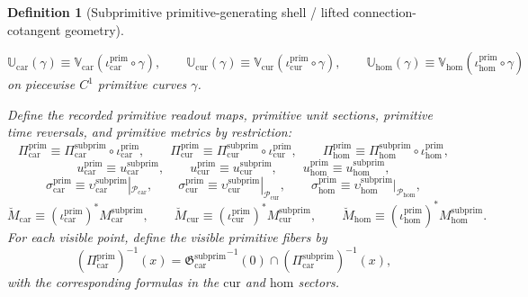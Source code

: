 \documentclass[11pt]{article}
\newcommand{\TensorPrimitiveSpace}{\mathcal P_{\mathrm{car}}}
\newcommand{\CurPrimitiveSpace}{\mathcal P_{\mathrm{cur}}}
\newcommand{\HomPrimitiveSpace}{\mathcal P_{\mathrm{hom}}}
\newcommand{\TensorPrimitiveRead}{\Pi_{\mathrm{car}}^{\mathrm{prim}}}
\newcommand{\CurPrimitiveRead}{\Pi_{\mathrm{cur}}^{\mathrm{prim}}}
\newcommand{\HomPrimitiveRead}{\Pi_{\mathrm{hom}}^{\mathrm{prim}}}
\newcommand{\TensorPrimitiveUnit}{u_{\mathrm{car}}^{\mathrm{prim}}}
\newcommand{\CurPrimitiveUnit}{u_{\mathrm{cur}}^{\mathrm{prim}}}
\newcommand{\HomPrimitiveUnit}{u_{\mathrm{hom}}^{\mathrm{prim}}}
\newcommand{\TensorPrimitiveTimeRev}{\sigma_{\mathrm{car}}^{\mathrm{prim}}}
\newcommand{\CurPrimitiveTimeRev}{\sigma_{\mathrm{cur}}^{\mathrm{prim}}}
\newcommand{\HomPrimitiveTimeRev}{\sigma_{\mathrm{hom}}^{\mathrm{prim}}}
\newcommand{\TensorPrimitiveSpaceMetric}{\breve M_{\mathrm{car}}}
\newcommand{\CurPrimitiveSpaceMetric}{\breve M_{\mathrm{cur}}}
\newcommand{\HomPrimitiveSpaceMetric}{\breve M_{\mathrm{hom}}}
\newcommand{\TensorPrimitiveTransport}{\mathbb U_{\mathrm{car}}}
\newcommand{\CurPrimitiveTransport}{\mathbb U_{\mathrm{cur}}}
\newcommand{\HomPrimitiveTransport}{\mathbb U_{\mathrm{hom}}}
\newcommand{\TensorSubprimitiveRead}{\Pi_{\mathrm{car}}^{\mathrm{subprim}}}
\newcommand{\CurSubprimitiveRead}{\Pi_{\mathrm{cur}}^{\mathrm{subprim}}}
\newcommand{\HomSubprimitiveRead}{\Pi_{\mathrm{hom}}^{\mathrm{subprim}}}
\newcommand{\TensorSubprimitiveUnit}{u_{\mathrm{car}}^{\mathrm{subprim}}}
\newcommand{\CurSubprimitiveUnit}{u_{\mathrm{cur}}^{\mathrm{subprim}}}
\newcommand{\HomSubprimitiveUnit}{u_{\mathrm{hom}}^{\mathrm{subprim}}}
\newcommand{\TensorSubprimitiveTimeRev}{\upsilon_{\mathrm{car}}^{\mathrm{subprim}}}
\newcommand{\CurSubprimitiveTimeRev}{\upsilon_{\mathrm{cur}}^{\mathrm{subprim}}}
\newcommand{\HomSubprimitiveTimeRev}{\upsilon_{\mathrm{hom}}^{\mathrm{subprim}}}
\newcommand{\TensorSubprimitiveSpaceMetric}{M_{\mathrm{car}}^{\mathrm{subprim}}}
\newcommand{\CurSubprimitiveSpaceMetric}{M_{\mathrm{cur}}^{\mathrm{subprim}}}
\newcommand{\HomSubprimitiveSpaceMetric}{M_{\mathrm{hom}}^{\mathrm{subprim}}}
\newcommand{\TensorSubprimitiveSection}{\mathfrak G_{\mathrm{car}}^{\mathrm{subprim}}}
\newcommand{\TensorPrimitiveInc}{\iota_{\mathrm{car}}^{\mathrm{prim}}}
\newcommand{\CurPrimitiveInc}{\iota_{\mathrm{cur}}^{\mathrm{prim}}}
\newcommand{\HomPrimitiveInc}{\iota_{\mathrm{hom}}^{\mathrm{prim}}}
\newcommand{\TensorSubprimitiveTransport}{\mathbb V_{\mathrm{car}}}
\newcommand{\CurSubprimitiveTransport}{\mathbb V_{\mathrm{cur}}}
\newcommand{\HomSubprimitiveTransport}{\mathbb V_{\mathrm{hom}}}
\newtheorem{definition}{Definition}
\begin{document}
\begin{definition}[Subprimitive primitive-generating shell / lifted connection-cotangent geometry]
\begin{enumerate}
\begin{equation}
    \end{equation}
    \begin{equation}
    \TensorPrimitiveTransport(\gamma)\equiv\TensorSubprimitiveTransport(\TensorPrimitiveInc\circ\gamma),\qquad
    \CurPrimitiveTransport(\gamma)\equiv\CurSubprimitiveTransport(\CurPrimitiveInc\circ\gamma),\qquad
    \HomPrimitiveTransport(\gamma)\equiv\HomSubprimitiveTransport(\HomPrimitiveInc\circ\gamma)
    \label{eq:primitive_transport_from_subprimitive}
    \end{equation}
    on piecewise \(C^1\) primitive curves \(\gamma\).
\end{enumerate}

Define the recorded primitive readout maps, primitive unit sections, primitive time reversals, and primitive metrics by restriction:
\begin{equation}
\TensorPrimitiveRead\equiv\TensorSubprimitiveRead\circ\TensorPrimitiveInc,\qquad
\CurPrimitiveRead\equiv\CurSubprimitiveRead\circ\CurPrimitiveInc,\qquad
\HomPrimitiveRead\equiv\HomSubprimitiveRead\circ\HomPrimitiveInc,
\label{eq:primitive_read_from_subprimitive}
\end{equation}
\begin{equation}
\TensorPrimitiveUnit\equiv\TensorSubprimitiveUnit,\qquad
\CurPrimitiveUnit\equiv\CurSubprimitiveUnit,\qquad
\HomPrimitiveUnit\equiv\HomSubprimitiveUnit,
\label{eq:primitive_unit_from_subprimitive}
\end{equation}
\begin{equation}
\TensorPrimitiveTimeRev\equiv\TensorSubprimitiveTimeRev|_{\TensorPrimitiveSpace},\qquad
\CurPrimitiveTimeRev\equiv\CurSubprimitiveTimeRev|_{\CurPrimitiveSpace},\qquad
\HomPrimitiveTimeRev\equiv\HomSubprimitiveTimeRev|_{\HomPrimitiveSpace},
\label{eq:primitive_time_rev_from_subprimitive}
\end{equation}
\begin{equation}
\TensorPrimitiveSpaceMetric\equiv(\TensorPrimitiveInc)^*\TensorSubprimitiveSpaceMetric,\qquad
\CurPrimitiveSpaceMetric\equiv(\CurPrimitiveInc)^*\CurSubprimitiveSpaceMetric,\qquad
\HomPrimitiveSpaceMetric\equiv(\HomPrimitiveInc)^*\HomSubprimitiveSpaceMetric.
\label{eq:primitive_metric_from_subprimitive}
\end{equation}
For each visible point, define the visible primitive fibers by
\begin{equation}
(\TensorPrimitiveRead)^{-1}(x)
=
{\TensorSubprimitiveSection}^{-1}(0)\cap(\TensorSubprimitiveRead)^{-1}(x),
\label{eq:primitive_fiber_from_subprimitive_car}
\end{equation}
with the corresponding formulas in the \(\mathrm{cur}\) and \(\mathrm{hom}\) sectors.
\end{definition}
\end{document}
